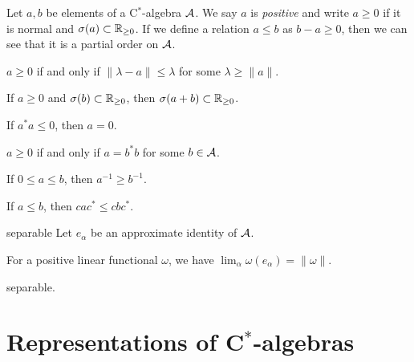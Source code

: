 \documentclass{../../large}
\begin{document}
\begin{prb}
Let $a,b$ be elements of a C$^*$-algebra $\mathcal{A}$.
We say $a$ is \emph{positive} and write $a\ge0$ if it is normal and $\sigma(a)\subset\mathbb{R}_{\ge0}$.
If we define a relation $a\le b$ as $b-a\ge0$, then we can see that it is a partial order on $\mathcal{A}$.
\begin{parts}
\item $a\ge0$ if and only if $\|\lambda-a\|\le\lambda$ for some $\lambda\ge\|a\|$.
\item If $a\ge0$ and $\sigma(b)\subset\mathbb{R}_{\ge0}$, then $\sigma(a+b)\subset\mathbb{R}_{\ge0}$.
\item If $a^*a\le0$, then $a=0$.
\item $a\ge0$ if and only if $a=b^*b$ for some $b\in\mathcal{A}$.
\end{parts}
\end{prb}
\begin{pf}

\end{pf}




\begin{prb}
\begin{parts}
\item If $0\le a\le b$, then $a^{-1}\ge b^{-1}$.
\item If $a\le b$, then $cac^*\le cbc^*$.
\end{parts}
\end{prb}

\begin{prb}


\end{prb}



\begin{prb}
separable
Let $e_\alpha$ be an approximate identity of $\mathcal{A}$.
\begin{parts}
\item For a positive linear functional $\omega$, we have $\lim_\alpha\omega(e_\alpha)=\|\omega\|$.
\item 
\item separable.
\end{parts}
\end{prb}




\section{Representations of C$^*$-algebras}
\end{document}
